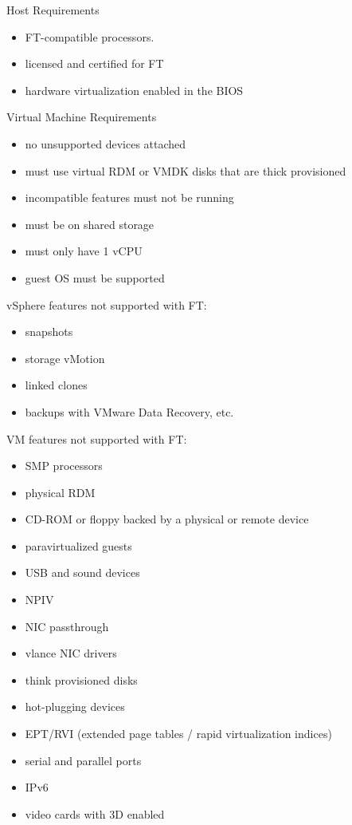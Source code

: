 Host Requirements

\begin{itemize}
\item FT-compatible processors.
\item licensed and certified for FT
\item hardware virtualization enabled in the BIOS
\end{itemize}

Virtual Machine Requirements

\begin{itemize}
\item no unsupported devices attached
\item must use virtual RDM or VMDK disks that are thick provisioned
\item incompatible features must not be running
\item must be on shared storage
\item must only have 1 vCPU
\item guest OS must be supported
\end{itemize}

vSphere features not supported with FT:

\begin{itemize}
\item snapshots
\item storage vMotion
\item linked clones
\item backups with VMware Data Recovery, etc.
\end{itemize}

VM features not supported with FT:

\begin{itemize}
\item SMP processors
\item physical RDM
\item CD-ROM or floppy backed by a physical or remote device
\item paravirtualized guests
\item USB and sound devices
\item NPIV
\item NIC passthrough
\item vlance NIC drivers
\item think provisioned disks
\item hot-plugging devices
\item EPT/RVI (extended page tables / rapid virtualization indices)
\item serial and parallel ports
\item IPv6
\item video cards with 3D enabled
\end{itemize}

